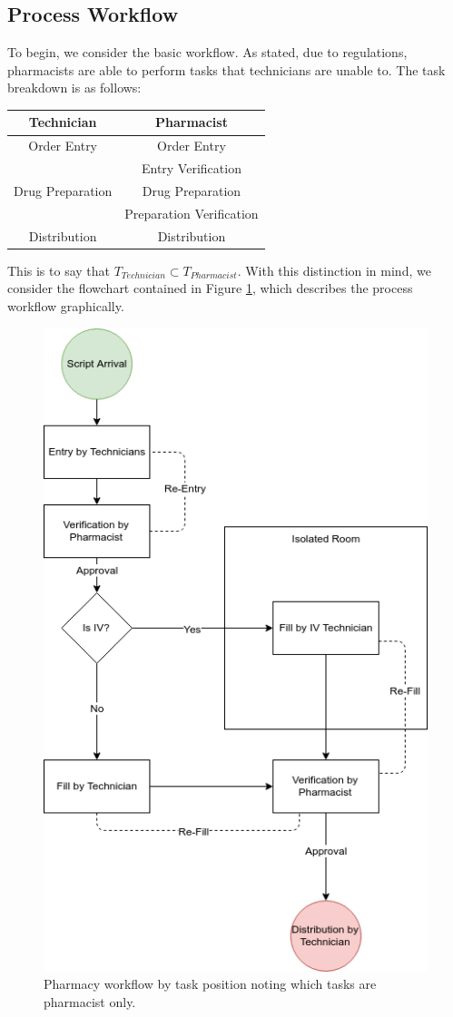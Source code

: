 \documentclass[11pt]{report}            %
\begin{document}
\subsection*{Process Workflow}
To begin, we consider the basic workflow. As stated, due to regulations, pharmacists are able to perform tasks that technicians are unable to. The task breakdown is as follows:
\begin{center}
\begin{tabular}{|c||c|}
\hline
Technician & Pharmacist\\\hline\hline
Order Entry & Order Entry \\\hline
& Entry Verification \\\hline
Drug Preparation & Drug Preparation\\\hline
& Preparation Verification\\\hline
Distribution & Distribution\\\hline
\end{tabular}
\end{center}
This is to say that $T_{Technician}\subset T_{Pharmacist}$.  With this distinction in mind, we consider the flowchart contained in Figure \ref{fig:flowchart}, which describes the process workflow graphically.
\begin{figure}[H]
\centering
\includegraphics[scale=.5]{Flowchart.png}
\caption{Pharmacy workflow by task position noting which tasks are pharmacist only.}
\label{fig:flowchart}
\end{figure}
\end{document}
